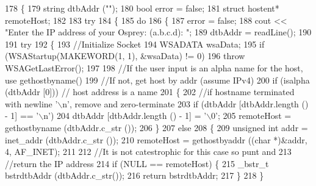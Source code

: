 \begin{DoxyCode}
178     \{
179         \textcolor{keywordtype}{string} dtbAddr (\textcolor{stringliteral}{""});
180         \textcolor{keywordtype}{bool} error = \textcolor{keyword}{false};
181         \textcolor{keyword}{struct }hostent* remoteHost;
182         
183         \textcolor{keywordflow}{try} 
184         \{
185             \textcolor{keywordflow}{do} 
186             \{
187                 error = \textcolor{keyword}{false};
188                 cout << \textcolor{stringliteral}{"Enter the IP address of your Osprey: (a.b.c.d): "};
189                 dtbAddr = readLine();
190 
191                 \textcolor{keywordflow}{try} 
192                 \{
193                     \textcolor{comment}{//Initialize Socket}
194                     WSADATA wsaData;
195                     \textcolor{keywordflow}{if} (WSAStartup(MAKEWORD(1, 1), &wsaData) != 0) 
196                         \textcolor{keywordflow}{throw} WSAGetLastError();
197 
198                     \textcolor{comment}{//If the user input is an alpha name for the host, use gethostbyname()}
199                     \textcolor{comment}{//If not, get host by addr (assume IPv4)}
200                     \textcolor{keywordflow}{if} (isalpha (dtbAddr [0])) \textcolor{comment}{// host address is a name }
201                     \{
202                         \textcolor{comment}{//if hostname terminated with newline '\(\backslash\)n', remove and zero-terminate }
203                         \textcolor{keywordflow}{if} (dtbAddr [dtbAddr.length () - 1] == \textcolor{charliteral}{'\(\backslash\)n'}) 
204                             dtbAddr [dtbAddr.length () - 1] = \textcolor{charliteral}{'\(\backslash\)0'}; 
205                         remoteHost = gethostbyname (dtbAddr.c\_str ());
206                     \}
207                     \textcolor{keywordflow}{else}  
208                     \{
209                         \textcolor{keywordtype}{unsigned} \textcolor{keywordtype}{int} addr = inet\_addr (dtbAddr.c\_str ());
210                         remoteHost = gethostbyaddr ((\textcolor{keywordtype}{char} *)&addr, 4, AF\_INET);
211 
212                         \textcolor{comment}{//It is not catestrophic for this case so punt and}
213                         \textcolor{comment}{//return the IP address}
214                         \textcolor{keywordflow}{if} (NULL == remoteHost) \{
215                             \_bstr\_t bstrdtbAddr (dtbAddr.c\_str());
216                             \textcolor{keywordflow}{return} bstrdtbAddr;
217                         \}
218                     \}

\end{DoxyCode}
